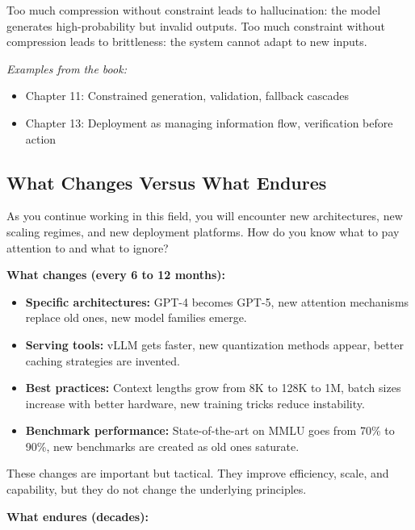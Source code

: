 Too much compression without constraint leads to hallucination: the model generates high-probability but invalid outputs. Too much constraint without compression leads to brittleness: the system cannot adapt to new inputs.

\textit{Examples from the book:}
\begin{itemize}
\item Chapter 11: Constrained generation, validation, fallback cascades
\item Chapter 13: Deployment as managing information flow, verification before action
\end{itemize}

\vspace{1em}

\subsection{What Changes Versus What Endures}

As you continue working in this field, you will encounter new architectures, new scaling regimes, and new deployment platforms. How do you know what to pay attention to and what to ignore?

\vspace{0.5em}

\textbf{What changes (every 6 to 12 months):}

\begin{itemize}
\item \textbf{Specific architectures:} GPT-4 becomes GPT-5, new attention mechanisms replace old ones, new model families emerge.
\item \textbf{Serving tools:} vLLM gets faster, new quantization methods appear, better caching strategies are invented.
\item \textbf{Best practices:} Context lengths grow from 8K to 128K to 1M, batch sizes increase with better hardware, new training tricks reduce instability.
\item \textbf{Benchmark performance:} State-of-the-art on MMLU goes from 70\% to 90\%, new benchmarks are created as old ones saturate.
\end{itemize}

These changes are important but tactical. They improve efficiency, scale, and capability, but they do not change the underlying principles.

\vspace{0.5em}

\textbf{What endures (decades):}

